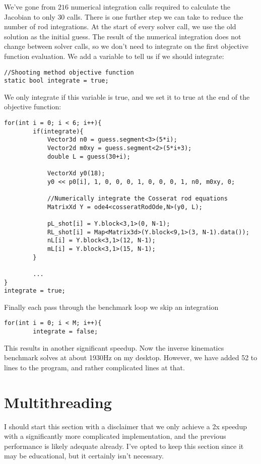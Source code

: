 \documentclass[12pt]{article}
\begin{document}
We've gone from $216$ numerical integration calls required to calculate the Jacobian to only $30$ calls. There is one further step we can take to reduce the number of rod integrations. At the start of every solver call, we use the old solution as the initial guess. The result of the numerical integration does not change between solver calls, so we don't need to integrate on the first objective function evaluation. We add a variable to tell us if we should integrate:
\begin{lstlisting}
//Shooting method objective function
static bool integrate = true;
\end{lstlisting}
We only integrate if this variable is true, and we set it to true at the end of the objective function:
\begin{lstlisting}
for(int i = 0; i < 6; i++){
        if(integrate){
            Vector3d n0 = guess.segment<3>(5*i);
            Vector2d m0xy = guess.segment<2>(5*i+3);
            double L = guess(30+i);

            VectorXd y0(18);
            y0 << p0[i], 1, 0, 0, 0, 1, 0, 0, 0, 1, n0, m0xy, 0;

            //Numerically integrate the Cosserat rod equations
            MatrixXd Y = ode4<cosseratRodOde,N>(y0, L);

            pL_shot[i] = Y.block<3,1>(0, N-1);
            RL_shot[i] = Map<Matrix3d>(Y.block<9,1>(3, N-1).data());
            nL[i] = Y.block<3,1>(12, N-1);
            mL[i] = Y.block<3,1>(15, N-1);
        }
				
        ...
}
integrate = true;
\end{lstlisting}
Finally each pass through the benchmark loop we skip an integration
\begin{lstlisting}
for(int i = 0; i < M; i++){
        integrate = false;
\end{lstlisting}
This results in another significant speedup. Now the inverse kinematics benchmark solves at about 1930Hz on my desktop. However, we have added 52 to lines to the program, and rather complicated lines at that.


\section{Multithreading}

I should start this section with a disclaimer that we only achieve a 2x speedup with a significantly more complicated implementation, and the previous performance is likely adequate already. I've opted to keep this section since it may be educational, but it certainly isn't necessary.
\end{document}
